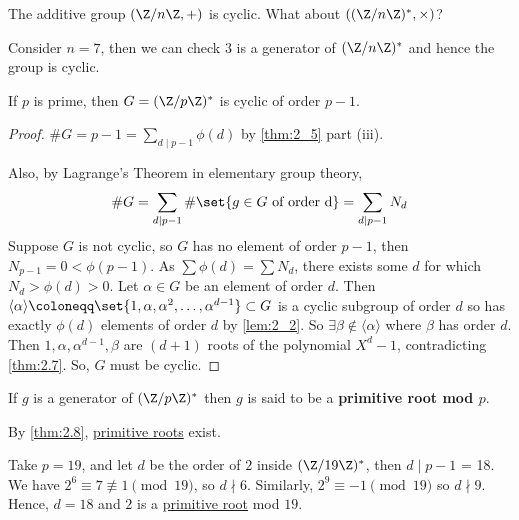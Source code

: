 \documentclass{article}
\begin{document}
The additive group $(\Z / n\Z, +)$ is cyclic. What about $((\Z/n\Z)^*, \times)$?

\begin{eg}
    Consider $n=7$, then we can check $3$ is a generator of $(\Z / n \Z)^*$ and hence the group is cyclic.
\end{eg}

\begin{nthm}\label{thm:2.8}
    If $p$ is prime, then $G = (\Z / p \Z)^*$ is cyclic of order $p-1$.
\end{nthm}

\begin{proof}
    $\# G = p-1 = \sum_{d \mid p-1} \phi(d)$ by \cref{thm:2_5} part (iii).

    Also, by Lagrange's Theorem in elementary group theory, \begin{equation*}\# G = \sum_{d \mid p-1} \# \set{g \in G \ \text{of order d}} = \sum_{d \mid p-1} N_d\end{equation*}
    Suppose $G$ is not cyclic, so $G$ has no element of order $p-1$, then ${N_{p-1} = 0 < \phi(p-1)}$.
    As $\sum \phi(d) = \sum N_d$, there exists some $d$ for which $N_d > \phi(d) > 0$. Let $\alpha \in G$ be an element of order $d$.
    Then $\langle\alpha\rangle \coloneqq \set{1, \alpha, \alpha^2, \dotsc, \alpha^{d-1}} \subset G$ is a cyclic subgroup of order $d$ so has exactly $\phi(d)$ elements of order $d$ by \cref{lem:2_2}.
    So $\exists \beta \notin \langle\alpha\rangle$ where $\beta$ has order $d$.
    Then $1, \alpha, \alpha^{d-1}, \beta$ are $(d+1)$ roots of the polynomial $X^d - 1$, contradicting \cref{thm:2.7}.
    So, $G$ must be cyclic.
\end{proof}


\begin{defi}
    If $g$ is a generator of $(\Z / p \Z)^*$ then $g$ is said to be a \textbf{primitive root mod $p$}.
\end{defi}

By \cref{thm:2.8}, \hyperlink{def:primRoot}{primitive roots} exist.

\begin{eg}
    Take $p = 19$, and let $d$ be the order of $2$ inside $(\Z/19\Z)^*$, then $d \mid p-1$ = 18.  We have $2^6 \equiv 7 \not\equiv 1 \pmod{19}$, so $d \nmid 6$.
    Similarly, $2^9 \equiv -1 \pmod{19}$ so $d \nmid 9$.  Hence, $d=18$ and $2$ is a \hyperlink{def:primRoot}{primitive root} mod $19$.
\end{eg}
\end{document}
